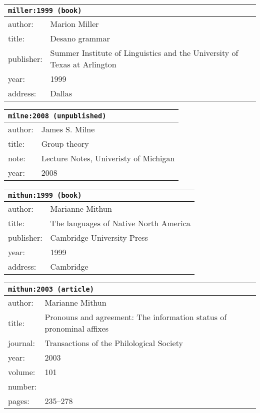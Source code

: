 \documentclass{article}
\begin{document}
\bigskip

\begin{tabular}{p{}p{}}
\multicolumn{2}{l}{\texttt{miller:1999 (book)}}\\
\hline
author: & Marion Miller\\
title: & Desano grammar\\
publisher: & Summer Institute of Linguistics and the University of Texas at Arlington\\
year: & 1999\\
address: & Dallas\\
\end{tabular}

\bigskip

\begin{tabular}{p{}p{}}
\multicolumn{2}{l}{\texttt{milne:2008 (unpublished)}}\\
\hline
author: & James S. Milne\\
title: & Group theory\\
note: & Lecture Notes, Univeristy of Michigan\\
year: & 2008\\
\end{tabular}

\bigskip

\begin{tabular}{p{}p{}}
\multicolumn{2}{l}{\texttt{mithun:1999 (book)}}\\
\hline
author: & Marianne Mithun\\
title: & The languages of Native North America\\
publisher: & Cambridge University Press\\
year: & 1999\\
address: & Cambridge\\
\end{tabular}

\bigskip

\begin{tabular}{p{}p{}}
\multicolumn{2}{l}{\texttt{mithun:2003 (article)}}\\
\hline
author: & Marianne Mithun\\
title: & Pronouns and agreement: The information status of pronominal affixes\\
journal: & Transactions of the Philological Society\\
year: & 2003\\
volume: & 101\\
number: & \\
pages: & 235--278\\
\end{tabular}
\end{document}
